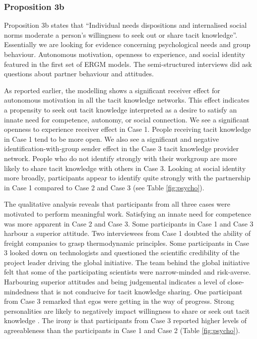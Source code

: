 \subsubsection{Proposition 3b}

Proposition 3b states that \enquote{Individual needs dispositions and internalised social norms moderate a person's willingness to seek out or share tacit knowledge}. Essentially we are looking for evidence concerning psychological needs and group behaviour. Autonomous motivation, openness to experience, and social identity featured in the first set of ERGM models. The semi-structured interviews did ask questions about partner behaviour and attitudes. \medskip 

As reported earlier, the modelling shows a significant receiver effect for autonomous motivation in all the tacit knowledge networks. This effect indicates a propensity to seek out tacit knowledge interpreted as a desire to satisfy an innate need for competence, autonomy, or social connection. We see a significant openness to experience receiver effect in Case 1. People receiving tacit knowledge in Case 1 tend to be more open. We also see a significant and negative identification-with-group sender effect in the Case 3 tacit knowledge provider network. People who do not identify strongly with their workgroup are more likely to share tacit knowledge with others in Case 3. Looking at social identity more broadly, participants appear to identify quite strongly with the partnership in Case 1 compared to Case 2 and Case 3 (see Table \ref{fig:psycho}). \medskip

The qualitative analysis reveals that participants from all three cases were motivated to perform meaningful work. Satisfying an innate need for competence was more apparent in Case 2 and Case 3. Some participants in Case 1 and Case 3 harbour a superior attitude. Two interviewees from Case 1 doubted the ability of freight companies to grasp thermodynamic principles. Some participants in Case 3 looked down on technologists and questioned the scientific credibility of the project leader driving the global initiative. The team behind the global initiative felt that some of the participating scientists were narrow-minded and risk-averse. Harbouring superior attitudes and being judgemental indicates a level of close-mindedness that is not conducive for tacit knowledge sharing. One participant from Case 3 remarked that egos were getting in the way of progress. Strong personalities are likely to negatively impact willingness to share or seek out tacit knowledge \citep{borges2012tacit}. The irony is that participants from Case 3 reported higher levels of agreeableness than the participants in Case 1 and Case 2 (Table \ref{fig:psycho}). \medskip

